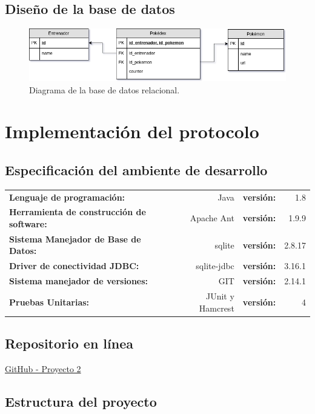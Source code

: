 \documentclass[12pt]{article}
\begin{document}
\subsection{Diseño de la base de datos}
 \begin{figure}[H]
   \centering
   \includegraphics[width=1\textwidth]{PokeDB2}
   \caption{Diagrama de la base de datos relacional.}
 \end{figure}

\section{Implementación del protocolo}
\subsection{Especificación del ambiente de desarrollo}\label{sec:env}
\begin{tabular}{l r l r}
  \textbf{Lenguaje de programación:} & Java & \textbf{versión:} & 1.8 \\
  \textbf{Herramienta de construcción de software:} & Apache Ant & \textbf{versión:} & 1.9.9 \\
  \textbf{Sistema Manejador de Base de Datos:} & sqlite & \textbf{versión:} & 2.8.17 \\
  \textbf{Driver de conectividad JDBC:} & sqlite-jdbc & \textbf{versión:}& 3.16.1\\
  \textbf{Sistema manejador de versiones:} & GIT & \textbf{versión:}& 2.14.1 \\
  \textbf{Pruebas Unitarias:} & JUnit y Hamcrest & \textbf{versión:}& 4 \\
  
\end{tabular}
\subsection{Repositorio en línea}
\begin{center}
  \href{https://github.com/Kihui/proyecto-redes/tree/master/p02}{GitHub - Proyecto 2}
\end{center}

\subsection{Estructura del proyecto}
\end{document}
